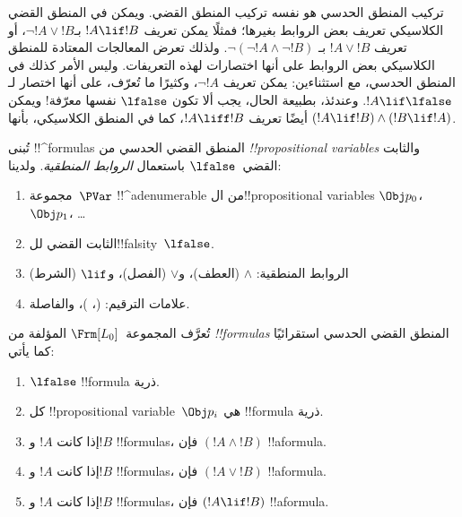 \documentclass[../../../include/open-logic-section]{subfiles}
\begin{document}


تركيب المنطق الحدسي هو نفسه تركيب المنطق القضي. ويمكن في المنطق القضي
الكلاسيكي تعريف بعض الروابط بغيرها؛ فمثلًا يمكن تعريف $!A \lif !B$
بـ$\lnot !A \lor !B$، أو تعريف $!A \lor !B$ بـ
$\lnot(\lnot !A \land \lnot !B)$. ولذلك تعرض المعالجات المعتادة
للمنطق الكلاسيكي بعض الروابط على أنها اختصارات لهذه التعريفات. وليس
الأمر كذلك في المنطق الحدسي، مع استثناءين: يمكن تعريف $\lnot !A$،
وكثيرًا ما تُعرّف، على أنها اختصار لـ$!A \lif \lfalse$. وعندئذ، بطبيعة
الحال، يجب ألا تكون $\lfalse$ نفسها معرّفة!{} ويمكن أيضًا تعريف
$!A \liff !B$، كما في المنطق الكلاسيكي، بأنها
$(!A \lif !B) \land (!B \lif !A)$.

تُبنى !!^{formula}s المنطق القضي الحدسي من
\emph{!!{propositional variable}s} والثابت القضي~$\lfalse$ باستعمال
\emph{الروابط المنطقية}. ولدينا:

\begin{enumerate}
\item مجموعة~$\PVar$ !!^a{denumerable} من ال!!{propositional variable}s
  $\Obj p_0$، $\Obj p_1$، \dots
  \item الثابت القضي لل!!{falsity}~$\lfalse$.
\item الروابط المنطقية: $\land$
  (العطف)، و$\lor$ (الفصل)، و$\lif$ (الشرط)
\item علامات الترقيم: (، )، والفاصلة.
\end{enumerate}

\begin{defn}[الصيغة]
 تُعرَّف المجموعة~$\Frm[L_0]$ المؤلفة من
\emph{!!{formula}s} المنطق القضي الحدسي استقرائيًا كما يأتي:
\begin{enumerate}
\item $\lfalse$ !!{formula} ذرية.

\item كل !!{propositional variable}~$\Obj p_i$ هي !!{formula} ذرية.

\item إذا كانت $!A$ و$!B$ !!{formula}s، فإن $(!A \land
  !B)$ !!a{formula}.

\item إذا كانت $!A$ و$!B$ !!{formula}s، فإن $(!A \lor !B)$
  !!a{formula}.

\item إذا كانت $!A$ و$!B$ !!{formula}s، فإن $(!A \lif !B)$
  !!a{formula}.

\end{enumerate}
\end{defn}
\end{document}
